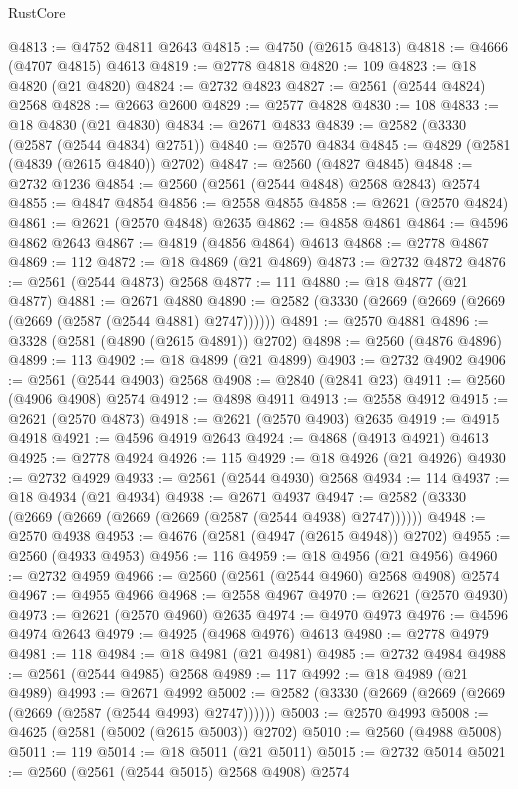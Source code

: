 \begin{lexlean}{RustCore}
\begin{coremodule}
@4813 := @4752 @4811 @2643
@4815 := @4750 (@2615 @4813)
@4818 := @4666 (@4707 @4815) @4613
@4819 := @2778 @4818
@4820 := 109
@4823 := @18 @4820 (@21 @4820)
@4824 := @2732 @4823
@4827 := @2561 (@2544 @4824) @2568
@4828 := @2663 @2600
@4829 := @2577 @4828
@4830 := 108
@4833 := @18 @4830 (@21 @4830)
@4834 := @2671 @4833
@4839 := @2582 (@3330 (@2587 (@2544 @4834) @2751))
@4840 := @2570 @4834
@4845 := @4829 (@2581 (@4839 (@2615 @4840)) @2702)
@4847 := @2560 (@4827 @4845)
@4848 := @2732 @1236
@4854 := @2560 (@2561 (@2544 @4848) @2568 @2843) @2574
@4855 := @4847 @4854
@4856 := @2558 @4855
@4858 := @2621 (@2570 @4824)
@4861 := @2621 (@2570 @4848) @2635
@4862 := @4858 @4861
@4864 := @4596 @4862 @2643
@4867 := @4819 (@4856 @4864) @4613
@4868 := @2778 @4867
@4869 := 112
@4872 := @18 @4869 (@21 @4869)
@4873 := @2732 @4872
@4876 := @2561 (@2544 @4873) @2568
@4877 := 111
@4880 := @18 @4877 (@21 @4877)
@4881 := @2671 @4880
@4890 := @2582 (@3330 (@2669 (@2669 (@2669 (@2669 (@2587 (@2544 @4881) @2747))))))
@4891 := @2570 @4881
@4896 := @3328 (@2581 (@4890 (@2615 @4891)) @2702)
@4898 := @2560 (@4876 @4896)
@4899 := 113
@4902 := @18 @4899 (@21 @4899)
@4903 := @2732 @4902
@4906 := @2561 (@2544 @4903) @2568
@4908 := @2840 (@2841 @23)
@4911 := @2560 (@4906 @4908) @2574
@4912 := @4898 @4911
@4913 := @2558 @4912
@4915 := @2621 (@2570 @4873)
@4918 := @2621 (@2570 @4903) @2635
@4919 := @4915 @4918
@4921 := @4596 @4919 @2643
@4924 := @4868 (@4913 @4921) @4613
@4925 := @2778 @4924
@4926 := 115
@4929 := @18 @4926 (@21 @4926)
@4930 := @2732 @4929
@4933 := @2561 (@2544 @4930) @2568
@4934 := 114
@4937 := @18 @4934 (@21 @4934)
@4938 := @2671 @4937
@4947 := @2582 (@3330 (@2669 (@2669 (@2669 (@2669 (@2587 (@2544 @4938) @2747))))))
@4948 := @2570 @4938
@4953 := @4676 (@2581 (@4947 (@2615 @4948)) @2702)
@4955 := @2560 (@4933 @4953)
@4956 := 116
@4959 := @18 @4956 (@21 @4956)
@4960 := @2732 @4959
@4966 := @2560 (@2561 (@2544 @4960) @2568 @4908) @2574
@4967 := @4955 @4966
@4968 := @2558 @4967
@4970 := @2621 (@2570 @4930)
@4973 := @2621 (@2570 @4960) @2635
@4974 := @4970 @4973
@4976 := @4596 @4974 @2643
@4979 := @4925 (@4968 @4976) @4613
@4980 := @2778 @4979
@4981 := 118
@4984 := @18 @4981 (@21 @4981)
@4985 := @2732 @4984
@4988 := @2561 (@2544 @4985) @2568
@4989 := 117
@4992 := @18 @4989 (@21 @4989)
@4993 := @2671 @4992
@5002 := @2582 (@3330 (@2669 (@2669 (@2669 (@2669 (@2587 (@2544 @4993) @2747))))))
@5003 := @2570 @4993
@5008 := @4625 (@2581 (@5002 (@2615 @5003)) @2702)
@5010 := @2560 (@4988 @5008)
@5011 := 119
@5014 := @18 @5011 (@21 @5011)
@5015 := @2732 @5014
@5021 := @2560 (@2561 (@2544 @5015) @2568 @4908) @2574

\end{coremodule}
\end{lexlean}
